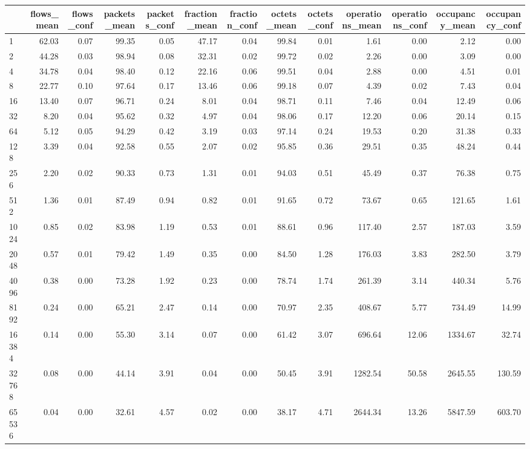 \begin{tabular}{lrrrrrrrrrrrr}
\toprule
 & flows_mean & flows_conf & packets_mean & packets_conf & fraction_mean & fraction_conf & octets_mean & octets_conf & operations_mean & operations_conf & occupancy_mean & occupancy_conf \\
\midrule
1 & 62.03 & 0.07 & 99.35 & 0.05 & 47.17 & 0.04 & 99.84 & 0.01 & 1.61 & 0.00 & 2.12 & 0.00 \\
2 & 44.28 & 0.03 & 98.94 & 0.08 & 32.31 & 0.02 & 99.72 & 0.02 & 2.26 & 0.00 & 3.09 & 0.00 \\
4 & 34.78 & 0.04 & 98.40 & 0.12 & 22.16 & 0.06 & 99.51 & 0.04 & 2.88 & 0.00 & 4.51 & 0.01 \\
8 & 22.77 & 0.10 & 97.64 & 0.17 & 13.46 & 0.06 & 99.18 & 0.07 & 4.39 & 0.02 & 7.43 & 0.04 \\
16 & 13.40 & 0.07 & 96.71 & 0.24 & 8.01 & 0.04 & 98.71 & 0.11 & 7.46 & 0.04 & 12.49 & 0.06 \\
32 & 8.20 & 0.04 & 95.62 & 0.32 & 4.97 & 0.04 & 98.06 & 0.17 & 12.20 & 0.06 & 20.14 & 0.15 \\
64 & 5.12 & 0.05 & 94.29 & 0.42 & 3.19 & 0.03 & 97.14 & 0.24 & 19.53 & 0.20 & 31.38 & 0.33 \\
128 & 3.39 & 0.04 & 92.58 & 0.55 & 2.07 & 0.02 & 95.85 & 0.36 & 29.51 & 0.35 & 48.24 & 0.44 \\
256 & 2.20 & 0.02 & 90.33 & 0.73 & 1.31 & 0.01 & 94.03 & 0.51 & 45.49 & 0.37 & 76.38 & 0.75 \\
512 & 1.36 & 0.01 & 87.49 & 0.94 & 0.82 & 0.01 & 91.65 & 0.72 & 73.67 & 0.65 & 121.65 & 1.61 \\
1024 & 0.85 & 0.02 & 83.98 & 1.19 & 0.53 & 0.01 & 88.61 & 0.96 & 117.40 & 2.57 & 187.03 & 3.59 \\
2048 & 0.57 & 0.01 & 79.42 & 1.49 & 0.35 & 0.00 & 84.50 & 1.28 & 176.03 & 3.83 & 282.50 & 3.79 \\
4096 & 0.38 & 0.00 & 73.28 & 1.92 & 0.23 & 0.00 & 78.74 & 1.74 & 261.39 & 3.14 & 440.34 & 5.76 \\
8192 & 0.24 & 0.00 & 65.21 & 2.47 & 0.14 & 0.00 & 70.97 & 2.35 & 408.67 & 5.77 & 734.49 & 14.99 \\
16384 & 0.14 & 0.00 & 55.30 & 3.14 & 0.07 & 0.00 & 61.42 & 3.07 & 696.64 & 12.06 & 1334.67 & 32.74 \\
32768 & 0.08 & 0.00 & 44.14 & 3.91 & 0.04 & 0.00 & 50.45 & 3.91 & 1282.54 & 50.58 & 2645.55 & 130.59 \\
65536 & 0.04 & 0.00 & 32.61 & 4.57 & 0.02 & 0.00 & 38.17 & 4.71 & 2644.34 & 13.26 & 5847.59 & 603.70 \\

\end{tabular}
